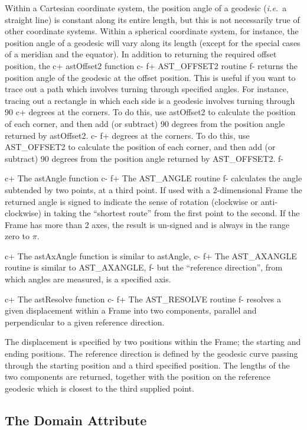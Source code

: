 \documentclass[twoside,11pt]{article}
\begin{document}
Within a Cartesian coordinate system, the position angle of a geodesic
({\em{i.e.}}\ a straight line) is constant along its entire length, but
this is not necessarily true of other coordinate systems. Within a
spherical coordinate system, for instance, the position angle of a geodesic
will vary along its length (except for the special cases of a meridian and
the equator). In addition to returning the required offset position, the 
c+
astOffset2 function 
c-
f+
AST\_OFFSET2 routine
f-
returns the position angle of the geodesic at the
offset position. This is useful if you want to trace out a path which
involves turning through specified angles. For instance, tracing out a
rectangle in which each side is a geodesic involves turning through 90 
c+
degrees at the corners. To do this, use astOffset2 to calculate the
position of each corner, and then add (or subtract) 90 degrees from the 
position angle returned by astOffset2.
c-
f+
degrees at the corners. To do this, use AST\_OFFSET2 to calculate the
position of each corner, and then add (or subtract) 90 degrees from the 
position angle returned by AST\_OFFSET2.
f-

c+
The astAngle function 
c-
f+
The AST\_ANGLE routine 
f-
calculates the angle subtended by two points, at a third point.
If used with a 2-dimensional Frame the returned angle
is signed to indicate the sense of rotation (clockwise or anti-clockwise)
in taking the ``shortest route'' from the first point to the second.
If the Frame has more than 2 axes, the result is un-signed and is always
in the range zero to $\pi$. 

c+
The astAxAngle function is similar to astAngle,
c-
f+
The AST\_AXANGLE routine is similar to AST\_AXANGLE,
f-
but the ``reference direction'', from which angles are measured, is 
a specified axis. 

c+
The astResolve function
c-
f+
The AST\_RESOLVE routine
f-
resolves a given displacement within a Frame into two components, parallel and 
perpendicular to a given reference direction. 

The displacement is specified by two positions within the Frame; the
starting and ending positions. The reference direction is defined by the 
geodesic curve passing through the starting position and a third specified
position. The lengths of the two components are returned, together with
the position on the reference geodesic which is closest to the third
supplied point.

\subsection{\label{ss:framedomains}The Domain Attribute}
\end{document}
